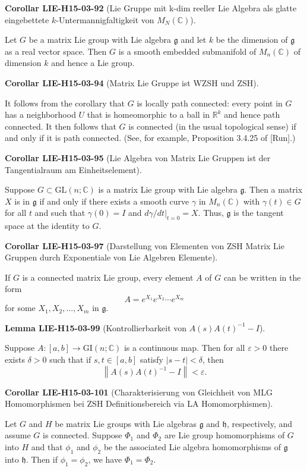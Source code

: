 \documentclass[10pt, letterpaper]{article}
\newcommand{\C}{\mathbb{C}}
\newcommand{\CustomHeading}[3]{%
  \par\medskip\noindent%
  \textbf{#1 #2} \textnormal{(#3)}.\enskip%
}
\newenvironment{LEM}[2]{\CustomHeading{Lemma}{#1}{#2}}{}
\newenvironment{KORO}[2]{\CustomHeading{Corollar}{#1}{#2}}{}
\begin{document}
\begin{KORO}{LIE-H15-03-92}{Lie Gruppe mit k-dim reeller Lie Algebra als glatte eingebettete $k$-Untermannigfaltigkeit von $M_N(\C)$}
Let $G$ be a matrix Lie group with Lie algebra $\mathfrak{g}$ and let $k$ be the dimension of $\mathfrak{g}$ as a real vector space. Then $G$ is a smooth embedded submanifold of $M_{n}(\mathbb{C})$ of dimension $k$ and hence a Lie group.
\end{KORO}

\begin{KORO}{LIE-H15-03-94}{Matrix Lie Gruppe ist WZSH und ZSH}
It follows from the corollary that $G$ is locally path connected: every point in $G$ has a neighborhood $U$ that is homeomorphic to a ball in $\mathbb{R}^{k}$ and hence path connected. It then follows that $G$ is connected (in the usual topological sense) if and only if it is path connected. (See, for example, Proposition 3.4.25 of [Run].)
\end{KORO}

\begin{KORO}{LIE-H15-03-95}{Lie Algebra von Matrix Lie Gruppen ist der Tangentialraum am Einheitselement}
Suppose $G \subset \mathrm{GL}(n ; \mathbb{C})$ is a matrix Lie group with Lie algebra $\mathfrak{g}$. Then a matrix $X$ is in $\mathfrak{g}$ if and only if there exists a smooth curve $\gamma$ in $M_{n}(\mathbb{C})$ with $\gamma(t) \in G$ for all $t$ and such that $\gamma(0)=I$ and $d \gamma /\left.d t\right|_{t=0}=X$. Thus, $\mathfrak{g}$ is the tangent space at the identity to $G$.
\end{KORO}

\begin{KORO}{LIE-H15-03-97}{Darstellung von Elementen von ZSH Matrix Lie Gruppen durch Exponentiale von Lie Algebren Elemente}
If $G$ is a connected matrix Lie group, every element $A$ of $G$ can be written in the form
$$
A=e^{X_{1}} e^{X_{2}} \cdots e^{X_{m}}
$$
for some $X_{1}, X_{2}, \ldots, X_{m}$ in $\mathfrak{g}$.
\end{KORO}

\begin{LEM}{LIE-H15-03-99}{Kontrollierbarkeit von $A(s)A(t)^{-1}-I$}
Suppose $A:[a, b] \rightarrow \mathrm{GI}(n ; \mathbb{C})$ is a continuous map. Then for all $\varepsilon>0$ there exists $\delta>0$ such that if $s, t \in[a, b]$ satisfy $|s-t|<\delta$, then
$$
\left\|A(s) A(t)^{-1}-I\right\|<\varepsilon .
$$
\end{LEM}

\begin{KORO}{LIE-H15-03-101}{Charakterisierung von Gleichheit von MLG Homomorphismen bei ZSH Definitionsbereich via LA Homomorphismen}
Let $G$ and $H$ be matrix Lie groups with Lie algebras $\mathfrak{g}$ and $\mathfrak{h}$, respectively, and assume $G$ is connected. Suppose $\Phi_{1}$ and $\Phi_{2}$ are Lie group homomorphisms of $G$ into $H$ and that $\phi_{1}$ and $\phi_{2}$ be the associated Lie algebra homomorphisms of $\mathfrak{g}$ into $\mathfrak{h}$. Then if $\phi_{1}=\phi_{2}$, we have $\Phi_{1}=\Phi_{2}$.
\end{KORO}
\end{document}
